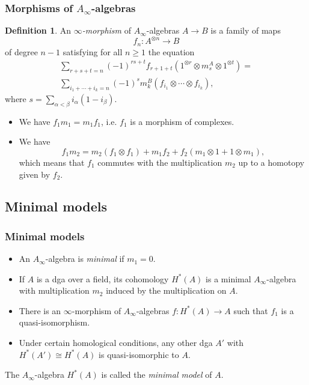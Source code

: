 \documentclass{beamer}
\theoremstyle{definition}
\newtheorem{defi}{Definition}
\begin{document}
\begin{frame}
\frametitle{Morphisms of $A_\infty$-algebras}
\begin{defi}
An \emph{$\infty$-morphism} of $A_\infty$-algebras $A\to B$ is a family of maps \[f_n:A^{\otimes n}\to B\] of degree $n-1$ satisfying for all $n\geq 1$ the equation
\begin{align*}
\sum_{r+s+t=n} (-1)^{rs+t}f_{r+1+t}(1^{\otimes r} \otimes m^A_s\otimes 1^{\otimes t})=\\
\sum_{i_1+\cdots+i_k=n} (-1)^s m^B_k(f_{i_1}\otimes\cdots\otimes f_{i_k}),
\end{align*}
where
$s=\sum_{\alpha<\beta}i_\alpha(1-i_\beta)$.%
%
\end{defi}

\end{frame}
\begin{frame}
\begin{itemize}
\item<1-> We have $f_1m_1 = m_1f_1$, i.e. $f_1$ is a morphism of complexes.
\item<2-> We have
\[
f_1m_2 = m_2 (f_1\otimes f_1) + m_1f_2 + f_2 (m_1\otimes 1 + 1\otimes m_1),\]
which means that $f_1$ commutes with the multiplication $m_2$ up to a homotopy
given by $f_2$.
\end{itemize}
\end{frame}

\subsection{Minimal models}
\begin{frame}
\frametitle{Minimal models}
\begin{itemize}
\item An $A_\infty$-algebra is \emph{minimal} if $m_1 = 0$. 
\end{itemize}\pause
\begin{theorem}[Kadeishvili]
\begin{itemize}
\item If $A$ is a dga over a field, its cohomology $H^*(A)$ is a minimal $A_\infty$-algebra with multiplication $m_2$ induced by the multiplication on $A$.
\item There is an $\infty$-morphism of $A_\infty$-algebras $f:H^*(A)\to A$ such that $f_1$ is a quasi-isomorphism.
\item Under certain homological conditions, any other dga $A'$ with $H^*(A')\cong H^*(A)$ is quasi-isomorphic to $A$. 
\end{itemize}
\end{theorem}\pause
The $A_\infty$-algebra $H^*(A)$ is called the \emph{minimal model} of $A$. %
\end{frame}
\end{document}
